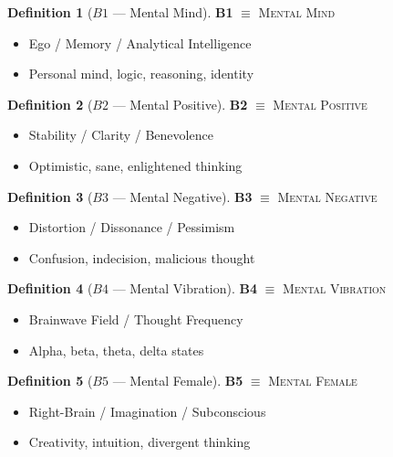 \documentclass[11pt,twoside,openright]{book}
\theoremstyle{definition}
\newtheorem{definition}{Definition}[chapter]
\theoremstyle{plain}
\theoremstyle{remark}
\begin{document}
\begin{definition}[$B1$ --- Mental Mind]
\label{def:B1}
\textbf{B1} $\equiv$ \textsc{Mental Mind}
\begin{itemize}
  \item Ego / Memory / Analytical Intelligence
  \item Personal mind, logic, reasoning, identity
\end{itemize}
\end{definition}

\begin{definition}[$B2$ --- Mental Positive]
\label{def:B2}
\textbf{B2} $\equiv$ \textsc{Mental Positive}
\begin{itemize}
  \item Stability / Clarity / Benevolence
  \item Optimistic, sane, enlightened thinking
\end{itemize}
\end{definition}

\begin{definition}[$B3$ --- Mental Negative]
\label{def:B3}
\textbf{B3} $\equiv$ \textsc{Mental Negative}
\begin{itemize}
  \item Distortion / Dissonance / Pessimism
  \item Confusion, indecision, malicious thought
\end{itemize}
\end{definition}

\begin{definition}[$B4$ --- Mental Vibration]
\label{def:B4}
\textbf{B4} $\equiv$ \textsc{Mental Vibration}
\begin{itemize}
  \item Brainwave Field / Thought Frequency
  \item Alpha, beta, theta, delta states
\end{itemize}
\end{definition}

\begin{definition}[$B5$ --- Mental Female]
\label{def:B5}
\textbf{B5} $\equiv$ \textsc{Mental Female}
\begin{itemize}
  \item Right-Brain / Imagination / Subconscious
  \item Creativity, intuition, divergent thinking
\end{itemize}
\end{definition}
\end{document}
